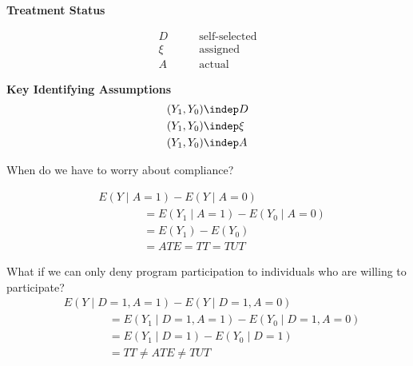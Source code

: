 \begin{frame}\textbf{Treatment Status}

\begin{align*}
D &\qquad \text{self-selected} \\
\xi &\qquad \text{assigned} \\
A &\qquad  \text{actual}
\end{align*}
\end{frame}
\begin{frame}\textbf{Key Identifying Assumptions}
\begin{align*}
(Y_1, Y_0) & \indep D \\
(Y_1, Y_0) & \indep \xi \\
(Y_1, Y_0) & \indep A
\end{align*}

When do we have to worry about compliance?

\end{frame}
\begin{frame}
\begin{align*}
& E(Y\mid A = 1) - E(Y\mid A = 0) \\
& \qquad\qquad = E(Y_1\mid A = 1) - E(Y_0\mid A = 0)  \tag{by full compliance} \\
& \qquad\qquad = E(Y_1) - E(Y_0)  \tag{by randomization} \\
& \qquad\qquad = ATE = TT = TUT
\end{align*}
\end{frame}
\begin{frame}
What if we can only deny program participation to individuals who are willing to participate?
\begin{align*}
& E(Y\mid D= 1, A = 1) - E(Y\mid D = 1, A = 0) \\
& \qquad\qquad = E(Y_1\mid D= 1, A = 1) - E(Y_0\mid D=1, A = 0) \\
& \qquad\qquad = E(Y_1\mid D = 1) - E(Y_0 \mid D = 1)  \\
& \qquad\qquad = TT \neq ATE \neq TUT
\end{align*}
\end{frame}
